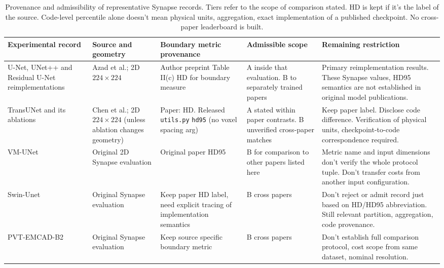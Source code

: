\documentclass[5p,times,authoryear]{elsarticle}
\begin{document}
\begin{table}[t]
\centering
\caption{Provenance and admissibility of representative Synapse records. Tiers refer to the scope of comparison stated. HD is kept if it's the label of the source. Code-level percentile alone doesn't mean physical units, aggregation, exact implementation of a published checkpoint. No cross-paper leaderboard is built.}
\label{tab:tradeoff_quantitative}
\scriptsize
\renewcommand{\arraystretch}{1.16}
\setlength{\tabcolsep}{3pt}
\begin{tabular}{>{\raggedright\arraybackslash}p{2.5cm}>{\raggedright\arraybackslash}p{2.9cm}>{\raggedright\arraybackslash}p{3.6cm}>{\raggedright\arraybackslash}p{3.0cm}>{\raggedright\arraybackslash}p{4.15cm}}
\toprule
\textbf{Experimental record} & \textbf{Source and geometry} & \textbf{Boundary metric provenance} & \textbf{Admissible scope} & \textbf{Remaining restriction} \\
\midrule
U-Net, UNet++ and Residual U-Net reimplementations
& Azad et al.; 2D $224\times224$ \citep{azad2024unet_verified}
& Author preprint Table II(c) HD for boundary measure
& A inside that evaluation. B to separately trained papers
& Primary reimplementation results. These Synapse values, HD95 semantics are not established in original model publications. \\
TransUNet and its ablations
& Chen et al.; 2D $224\times224$ (unless ablation changes geometry) \citep{chen2021transunet}
& Paper: HD. Released \texttt{utils.py} \texttt{hd95} (no voxel spacing arg) \citep{transunet_code_verified}
& A stated within paper contrasts. B unverified cross-paper matches
& Keep paper label. Disclose code difference. Verification of physical units, checkpoint-to-code correspondence required. \\
VM-UNet
& Original 2D Synapse evaluation \citep{ruan2024vm}
& Original paper HD95
& B for comparison to other papers listed here
& Metric name and input dimensions don't verify the whole protocol tuple. Don't transfer costs from another input configuration. \\
Swin-Unet
& Original Synapse evaluation \citep{cao2022swinunet}
& Keep paper HD label, need explicit tracing of implementation semantics
& B cross papers
& Don't reject or admit record just based on HD/HD95 abbreviation. Still relevant partition, aggregation, code provenance. \\
PVT-EMCAD-B2
& Original Synapse evaluation \citep{rahman2024emcad}
& Keep source specific boundary metric
& B cross papers
& Don't establish full comparison protocol, cost scope from same dataset, nominal resolution. \\

\end{tabular}
\end{table}
\end{document}
